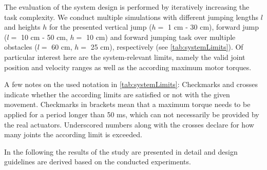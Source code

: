 The evaluation of the system design is performed by iteratively increasing the task complexity. We conduct multiple simulations with different jumping lengths $l$ and heights $h$ for the presented vertical jump ($h=$ 1 cm - 30 cm), forward jump ($l=$ 10 cm - 50 cm, $h=$ 10 cm) and forward jumping task over multiple obstacles ($l=$ 60 cm, $h=$ 25 cm), respectively (see \cref{tab:systemLimits}). Of particular interest here are the system-relevant limits, namely the valid  joint position and velocity ranges as well as the according maximum  motor torques. 

A few notes on the used notation in \cref{tab:systemLimits}: Checkmarks and crosses indicate whether the according limits are satisfied or not with the given movement. Checkmarks in brackets mean that a maximum torque needs to be applied for a period longer than 50 ms, which can not necessarily be provided by the real actuators. Underscored numbers along with the crosses declare for how many joints the according limit is exceeded.

In the following the results of the study are presented in detail and design guidelines are derived based on the conducted experiments. 


